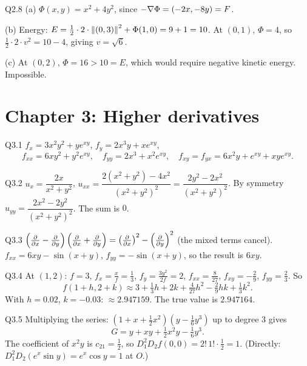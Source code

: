 \begin{solution}{Q2.8}
(a) $\Phi(x,y)=x^2+4y^2$, since $-\nabla\Phi=(-2x,-8y)=F$.

(b) Energy: $E=\tfrac12\cdot2\cdot\left\lVert (0,3)\right\rVert^2+\Phi(1,0)=9+1=10$. At $(0,1)$, $\Phi=4$, so
$\tfrac12\cdot2\cdot v^2=10-4$, giving $v=\sqrt6$.

(c) At $(0,2)$, $\Phi=16>10=E$, which would require negative kinetic energy. Impossible.
\end{solution}

\section{Chapter 3: Higher derivatives}

\begin{solution}{Q3.1}
$f_x=3x^2y^2+ye^{xy}$, $f_y=2x^3y+xe^{xy}$,
\[ f_{xx}=6xy^2+y^2e^{xy},\quad f_{yy}=2x^3+x^2e^{xy},\quad f_{xy}=f_{yx}=6x^2y+e^{xy}+xye^{xy}. \]
\end{solution}

\begin{solution}{Q3.2}
$u_x=\dfrac{2x}{x^2+y^2}$, $u_{xx}=\dfrac{2(x^2+y^2)-4x^2}{(x^2+y^2)^2}=\dfrac{2y^2-2x^2}{(x^2+y^2)^2}$. By symmetry
$u_{yy}=\dfrac{2x^2-2y^2}{(x^2+y^2)^2}$. The sum is $0$.
\end{solution}

\begin{solution}{Q3.3}
$\left(\frac{\partial }{\partial x}-\frac{\partial }{\partial y}\right)\left(\frac{\partial }{\partial x}+\frac{\partial }{\partial y}\right)=\left(\frac{\partial }{\partial x}\right)^2-\left(\frac{\partial }{\partial y}\right)^2$ (the mixed terms cancel).
$f_{xx}=6xy-\sin(x+y)$, $f_{yy}=-\sin(x+y)$, so the result is $6xy$.
\end{solution}

\begin{solution}{Q3.4}
At $(1,2)$: $f=3$, $f_x=\frac xf=\frac13$, $f_y=\frac{3y^2}{2f}=2$, $f_{xx}=\frac{8}{27}$, $f_{xy}=-\frac29$, $f_{yy}=\frac23$. So
\[ f(1+h,2+k)\approx3+\tfrac13h+2k+\tfrac{4}{27}h^2-\tfrac29hk+\tfrac13k^2 . \]
With $h=0.02$, $k=-0.03$: $\approx2.947159$. The true value is $2.947164$.
\end{solution}

\begin{solution}{Q3.5}
Multiplying the series: $(1+x+\tfrac12x^2)(y-\tfrac16y^3)$ up to degree $3$ gives
\[ G=y+xy+\tfrac12x^2y-\tfrac16y^3 . \]
The coefficient of $x^2y$ is $c_{21}=\tfrac12$, so $D_1^2D_2f(0,0)=2!\,1!\cdot\tfrac12=1$. (Directly:
$D_1^2D_2(e^x\sin y)=e^x\cos y=1$ at $O$.)
\end{solution}


